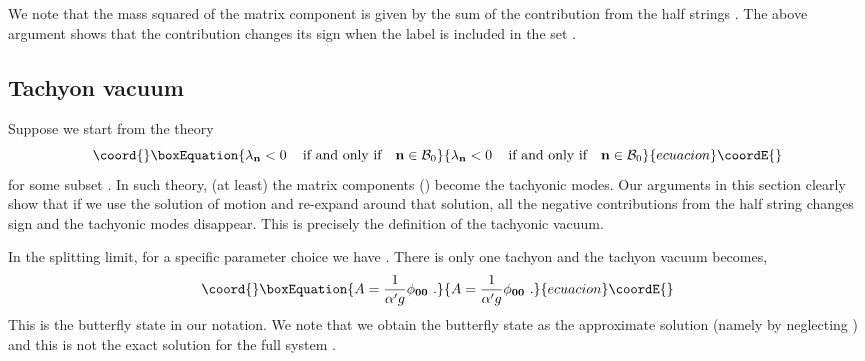 \documentclass[a4paper,aps,preprint,nofootinbib,eqsecnum]{revtex4}
\begin{document}
We note that the mass squared of the matrix component \coordHE{} is
given by the sum of the contribution from the half strings \coordHE{}. The above argument shows that the
contribution changes its sign when the label \coordHE{} is included in the
set \coordHE{}.

\subsection{Tachyon vacuum}

Suppose we start from the theory
\begin{equation}\coord{}\boxEquation{
\lambda _{\mathbf{n}}<0\,\quad \mbox{if and only if}\quad \mathbf{n}\in
\mathcal{B}_{0}
}{
\lambda _{\mathbf{n}}<0\,\quad \mbox{if and only if}\quad \mathbf{n}\in
\mathcal{B}_{0}
}{ecuacion}\coordE{}\end{equation}%
for some subset \coordHE{}. In such theory, (at
least) the matrix components \coordHE{} (\coordHE{}) become the tachyonic modes. Our arguments in this section clearly
show that if we use the solution of motion \coordHE{} and
re-expand around that solution, all the negative contributions from the half
string changes sign and the tachyonic modes disappear. This is precisely the
definition of the tachyonic vacuum.

In the splitting limit, for a specific parameter choice \coordHE{} we have
\coordHE{}. There is only one tachyon \coordHE{} and the tachyon vacuum becomes,
\begin{equation}\coord{}\boxEquation{  \label{tachyon-vacuum}
A=\frac{1}{{\alpha^{\prime}} g}\phi_{\mathbf{00}}\,\,.
}{  A=\frac{1}{{\alpha^{\prime}} g}\phi_{\mathbf{00}}\,\,.
}{ecuacion}\coordE{}\end{equation}
This is the butterfly state in our notation. We note that we obtain the
butterfly state as the approximate solution (namely by neglecting \coordHE{}) and
this is not the exact solution for the full system \coordHE{}.
\end{document}
